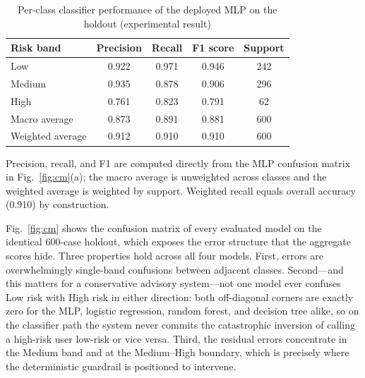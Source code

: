 \begin{table}[t]
\centering
\caption{Per-class classifier performance of the deployed MLP on the holdout
(experimental result)}
\label{tab:perclass}
\begin{tabularx}{\linewidth}{@{}l C C C C@{}}
\toprule
Risk band & Precision & Recall & F1 score & Support \\
\midrule
Low & 0.922 & 0.971 & 0.946 & 242 \\
Medium & 0.935 & 0.878 & 0.906 & 296 \\
High & 0.761 & 0.823 & 0.791 & 62 \\
\midrule
Macro average & 0.873 & 0.891 & 0.881 & 600 \\
Weighted average & 0.912 & 0.910 & 0.910 & 600 \\
\bottomrule
\end{tabularx}
\par\vspace{3pt}
{\footnotesize\itshape\raggedright Precision, recall, and F1 are computed directly from
the MLP confusion matrix in Fig.~\ref{fig:cm}(a); the macro average is unweighted across
classes and the weighted average is weighted by support. Weighted recall equals overall
accuracy (0.910) by construction.\par}
\end{table}

Fig.~\ref{fig:cm} shows the confusion matrix of every evaluated model on the identical
600-case holdout, which exposes the error structure that the aggregate scores hide. Three
properties hold across all four models. First, errors are overwhelmingly single-band
confusions between adjacent classes. Second---and this matters for a conservative
advisory system---not one model ever confuses Low risk with High risk in either
direction: both off-diagonal corners are exactly zero for the MLP, logistic regression,
random forest, and decision tree alike, so on the classifier path the system never
commits the catastrophic inversion of calling a high-risk user low-risk or vice versa.
Third, the residual errors concentrate in the Medium band and at the Medium--High
boundary, which is precisely where the deterministic guardrail is positioned to intervene.

